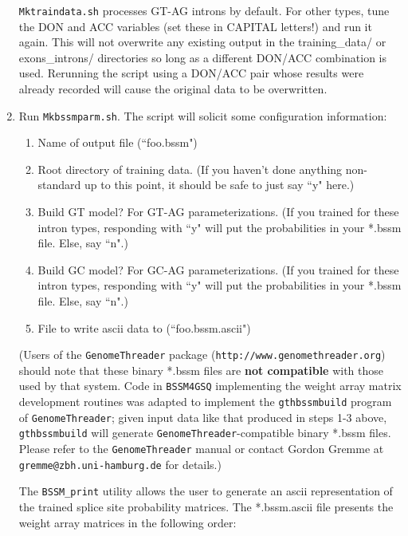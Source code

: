 \documentclass[11pt]{article}
\begin{document}
\begin{enumerate}
  \texttt{Mktraindata.sh} processes GT-AG introns by default.
  For other types, tune the DON and ACC variables (set these in CAPITAL letters!)
  and run it again.  This will not overwrite any existing output in
  the training\_data/ or exons\_introns/ directories so long as a
  different DON/ACC combination is used.  Rerunning the script
  using a DON/ACC pair whose results were already recorded will
  cause the original data to be overwritten.

  \item
  Run \texttt{Mkbssmparm.sh}.  The script will solicit some configuration
  information:

  \begin{enumerate}
    \item
    Name of output file (``foo.bssm")
    \item
    Root directory of training data.  (If you haven't done
    anything non-standard up to this point, it should be safe
    to just say ``y" here.)
    \item
    Build GT model?  For GT-AG parameterizations.  (If you trained
    for these intron types, responding with ``y" will put the
    probabilities in your *.bssm file.  Else, say ``n".)
    \item
    Build GC model?  For GC-AG parameterizations.  (If you trained
    for these intron types, responding with ``y" will put the
    probabilities in your *.bssm file.  Else, say ``n".)
    \item
    File to write ascii data to (``foo.bssm.ascii")
  \end{enumerate}

  (Users of the \texttt{GenomeThreader} package
  (\texttt{http://www.genomethreader.org})
  should note that these binary *.bssm files are \textbf{not compatible} with
  those used by that system.  Code in \texttt{BSSM4GSQ} implementing the
  weight array matrix development routines
  was adapted to implement the \texttt{gthbssmbuild} program
  of \texttt{GenomeThreader}; given input data like that produced in steps
  1-3 above, \texttt{gthbssmbuild} will generate \texttt{GenomeThreader}-compatible
  binary *.bssm files.
  Please refer to the \texttt{GenomeThreader} manual or
  contact Gordon Gremme at \texttt{gremme@zbh.uni-hamburg.de} for details.)

  The \texttt{BSSM\_print} utility allows the user to generate an ascii
  representation of the trained splice site probability matrices.
  The *.bssm.ascii file presents the weight array matrices in the following
  order:


\end{enumerate}
\end{document}

